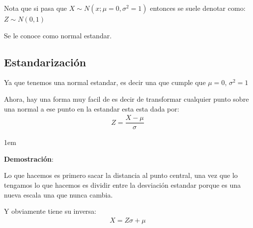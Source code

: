 \documentclass[12pt, fleqn]{report}                             %
\newenvironment{SmallIndentation}[1][0.75em]                    %
        {\begin{adjustwidth}{#1}{}\begin{footnotesize}}             %
        {\end{footnotesize}\end{adjustwidth}}                       %
\newcommand \Quote {\qq}                                        %
\theoremstyle{break}                                            %
\begin{document}
                    Nota que si pasa que $X \sim N(x; \mu = 0, \sigma^2 = 1)$
                    entonces se suele denotar como:
                    \\$Z \sim N(0, 1)$ 

                    Se le conoce como normal estandar.

            \subsection{Estandarización}  

                Ya que tenemos una normal estandar, es decir una que cumple que $\mu = 0$,
                $\sigma^2 = 1$

                Ahora, hay una forma muy facil de \Quote{estandarizar} es decir
                de transformar cualquier punto sobre una normal a ese punto en la estandar
                esta esta dada por:
                \begin{align*}
                    Z = \dfrac{X - \mu}{\sigma}
                \end{align*}

                \begin{SmallIndentation}[1em]
                    \textbf{Demostración}:
                    
                    Lo que hacemos es primero sacar la distancia al punto central, una vez que lo tengamos
                    lo que hacemos es dividir entre la desviación estandar porque es una nueva escala
                    una que nunca cambia.
                
                \end{SmallIndentation}
                    

                Y obviamente tiene su inversa:
                \begin{align*}
                    X = Z\sigma  + \mu
                \end{align*}


            \clearpage
\end{document}
